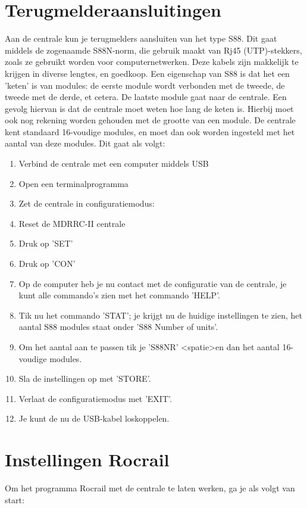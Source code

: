 \documentclass[12pt,a4paper]{report}
\begin{document}
\chapter{Terugmelderaansluitingen}
\label{ch:terugmeldingen}
Aan de centrale kun je terugmelders aansluiten van het type S88. Dit gaat middels de zogenaamde S88N-norm, die gebruik maakt van Rj45 (UTP)-stekkers, zoals ze gebruikt worden voor computernetwerken. Deze kabels zijn makkelijk te krijgen in diverse lengtes, en goedkoop.
Een eigenschap van S88 is dat het een 'keten' is van modules: de eerste module wordt verbonden met de tweede, de tweede met de derde, et cetera. De laatste module gaat naar de centrale. Een gevolg hiervan is dat de centrale moet weten hoe lang de keten is. Hierbij moet ook nog rekening worden gehouden met de grootte van een module. De centrale kent standaard 16-voudige modules, en moet dan ook worden ingesteld met het aantal van deze modules.
Dit gaat als volgt: 
\begin{enumerate}
\item Verbind de centrale met een computer middels USB
\item Open een terminalprogramma
\item Zet de centrale in configuratiemodus: 
\item Reset de MDRRC-II centrale
\item Druk op 'SET'
\item Druk op 'CON'
\item Op de computer heb je nu contact met de configuratie van de centrale, je kunt alle commando's zien met het commando 'HELP'.
\item Tik nu het commando 'STAT'; je krijgt nu de huidige instellingen te zien, het aantal S88 modules staat onder 'S88 Number of units'.
\item Om het aantal aan te passen tik je 'S88NR' \textless spatie\textgreater en dan het aantal 16-voudige modules.
\item Sla de instellingen op met 'STORE'.
\item Verlaat de configuratiemodus met 'EXIT'.
\item Je kunt de nu de USB-kabel loskoppelen.
\end{enumerate}

\chapter{Instellingen Rocrail}
\label{ch:rocrail}
Om het programma Rocrail met de centrale te laten werken, ga je als volgt van start:
\end{document}
